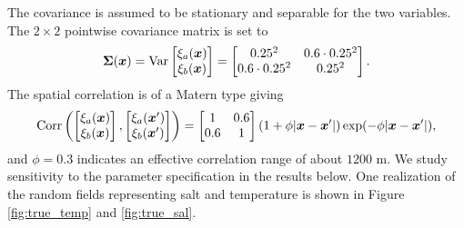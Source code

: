 \documentclass[aoas]{imsart}
\begin{document}
The covariance is assumed to be stationary and separable for the two variables. 
The $2 \times 2$ pointwise covariance matrix is set to
\begin{equation}\label{v0}
\bSigma(\bx)=\mbox{Var} 
\begin{bmatrix}
    \xi_a(\bx) \\
    \xi_b(\bx) 
    \end{bmatrix}=
\begin{bmatrix}
0.25^2 & 0.6 \cdot 0.25^2 \\
0.6 \cdot 0.25^2 & 0.25^2
\end{bmatrix}.
\end{equation}
The spatial correlation is of a Matern type giving
\begin{equation}\label{v}
\mbox{Corr} 
\left(
\begin{bmatrix}
    \xi_a(\bx) \\
    \xi_b(\bx) 
    \end{bmatrix},
    \begin{bmatrix}
    \xi_a(\bx') \\
    \xi_b(\bx') 
    \end{bmatrix}
    \right)
    = \begin{bmatrix}
1 & 0.6  \\
0.6  & 1
\end{bmatrix}(1+\phi |\bx-\bx'|)\exp (-\phi |\bx-\bx'|),
\end{equation}
and $\phi=0.3$ indicates an effective correlation range of about $1200$ m. 
We study sensitivity to the parameter specification in the results below.
One realization of the random fields representing salt and temperature is shown in Figure \ref{fig:true_temp} and \ref{fig:true_sal}.
\end{document}
